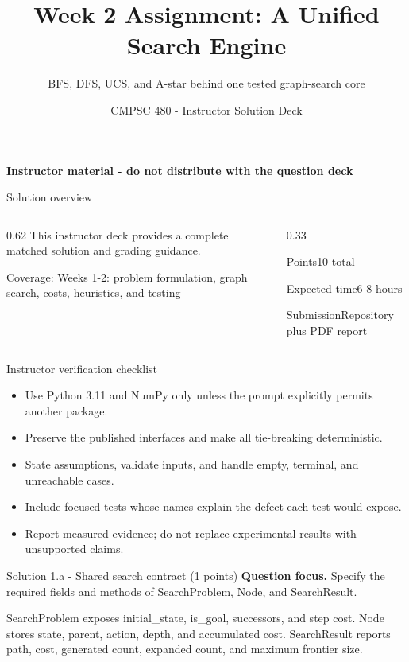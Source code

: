 \documentclass[aspectratio=169,11pt]{beamer}
\title[Week 2 Assignment Solutions]{Week 2 Assignment: A Unified Search Engine}
\subtitle{BFS, DFS, UCS, and A-star behind one tested graph-search core}
\author{CMPSC 480 - Instructor Solution Deck}
\date{}
\begin{document}
\begin{frame}
  \titlepage
\vspace{-0.35cm}
\begin{center}
\color{coursered}\bfseries Instructor material - do not distribute with the question deck
\end{center}
\end{frame}

\begin{frame}{Solution overview}
\begin{columns}[T,onlytextwidth]
\begin{column}{0.62\textwidth}
\Large This instructor deck provides a complete matched solution and grading guidance.

\vspace{0.35cm}
\normalsize
Coverage: Weeks 1-2: problem formulation, graph search, costs, heuristics, and testing
\end{column}
\begin{column}{0.33\textwidth}
\begin{block}{Points}10 total\end{block}
\begin{block}{Expected time}6-8 hours\end{block}
\begin{block}{Submission}Repository plus PDF report\end{block}
\end{column}
\end{columns}
\end{frame}

\begin{frame}{Instructor verification checklist}
\small
\begin{itemize}
  \item Use Python 3.11 and NumPy only unless the prompt explicitly permits another package.
  \item Preserve the published interfaces and make all tie-breaking deterministic.
  \item State assumptions, validate inputs, and handle empty, terminal, and unreachable cases.
  \item Include focused tests whose names explain the defect each test would expose.
  \item Report measured evidence; do not replace experimental results with unsupported claims.
\end{itemize}
\end{frame}

\begin{frame}{Solution 1.a - Shared search contract (1 points)}
\small
\textbf{Question focus.} Specify the required fields and methods of SearchProblem, Node, and SearchResult.

\vspace{0.25cm}
\answerlabel SearchProblem exposes initial\_state, is\_goal, successors, and step cost. Node stores state, parent, action, depth, and accumulated cost. SearchResult reports path, cost, generated count, expanded count, and maximum frontier size.
\end{frame}
\end{document}
